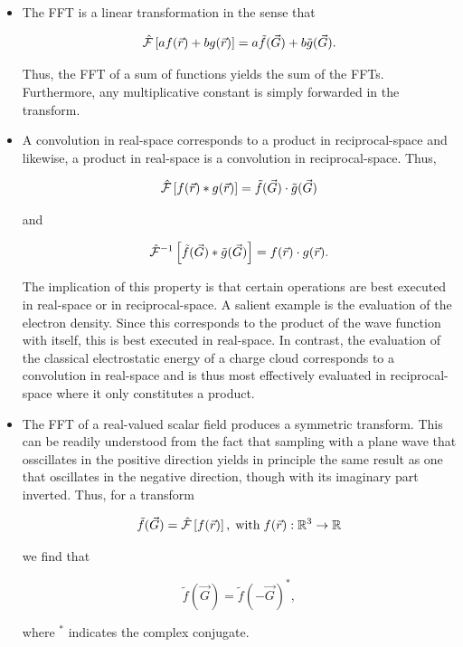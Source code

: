 \begin{itemize}
    \item 

    The FFT is a linear transformation in the sense that

    \begin{equation}
        \hat{\mathcal{F}}\left[a f(\vec{r}) + bg(\vec{r}) \right] = a\tilde{f}(\vec{G}) + b\tilde{g}(\vec{G}).
    \end{equation}
    
    Thus, the FFT of a sum of functions yields the sum of the FFTs. Furthermore, any multiplicative constant is simply forwarded in the transform.

    \item 

    A convolution in real-space corresponds to a product in reciprocal-space and likewise, a product in real-space is a convolution in reciprocal-space. Thus,

    \begin{equation}
        \hat{\mathcal{F}}\left[f(\vec{r}) \ast g(\vec{r}) \right] = \tilde{f}(\vec{G}) \cdot \tilde{g}(\vec{G})
    \end{equation}

    and

    \begin{equation}
        \hat{\mathcal{F}}^{-1}\left[\tilde{f}(\vec{G}) \ast \tilde{g}(\vec{G}) \right] = f(\vec{r}) \cdot g(\vec{r}).
    \end{equation}

    The implication of this property is that certain operations are best executed in real-space or in reciprocal-space. A salient example is the evaluation of the electron density. Since this corresponds to the product of the wave function with itself, this is best executed in real-space. In contrast, the evaluation of the classical electrostatic energy of a charge cloud corresponds to a convolution in real-space and is thus most effectively evaluated in reciprocal-space where it only constitutes a product.

    \item

    The FFT of a real-valued scalar field produces a symmetric transform. This can be readily understood from the fact that sampling with a plane wave that osscillates in the positive direction yields in principle the same result as one that oscillates in the negative direction, though with its imaginary part inverted. Thus, for a transform
    
    \begin{equation}
        \tilde{f}(\vec{G}) = \hat{\mathcal{F}}\left[f(\vec{r})\right],\;\text{with}\;f(\vec{r}): \mathbb{R}^{3} \rightarrow \mathbb{R}
    \end{equation}
    
    we find that
    
    \begin{equation}
        \tilde{f}(\vec{G}) = \tilde{f}(-\vec{G})^{*},
    \end{equation}

    where $^{*}$ indicates the complex conjugate.
    
\end{itemize}

